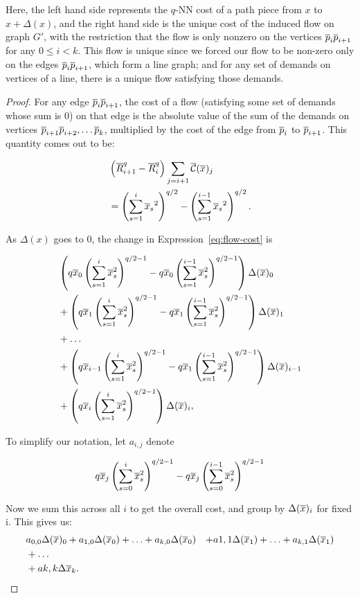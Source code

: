 Here, the left hand side represents the $q$-NN cost of a path piece from
$x$ to $x+\Delta(x)$, and the right hand side is the unique cost of the
induced flow on graph $G'$, with the restriction that the flow is only
nonzero on the vertices $\overline{p}_i\overline{p}_{i+1}$ for any $0 \leq i < k$. This flow
is unique since we forced our flow to be non-zero only on the edges
$\overline{p}_i\overline{p}_{i+1}$, which form a line graph; and for any set of demands on
vertices of a line, there is a unique flow satisfying those demands.

\begin{proof} For any edge $\overline{p}_i\overline{p}_{i+1}$, the cost of a flow (satisfying
some set of demands whose sum is $0$) on that edge is the absolute value of
the sum of the demands on vertices $\overline{p}_{i+1} \overline{p}_{i+2}, \ldots \overline{p}_k$,
multiplied by the cost of the edge from $\overline{p}_i$ to $\overline{p}_{i+1}$. This
quantity comes out to be:

\begin{align} &\left(\overline{R}_{i+1}^q-\overline{R}_{i}^q \right) \sum_{j=i+1} \overline{\mathcal{C}}(\overline{x})_j
\\
\label{eq:flow-cost}
&=\left(\sum_{s=1}^i {\overline{x}_s}^2\right)^{q/2} -\left(\sum_{s=1}^{i-1}
{\overline{x}_s}^2\right)^{q/2}.
\end{align}

As $\Delta(x)$ goes to $0$, the change in Expression~\ref{eq:flow-cost} is

\begin{align}
&
\left(q\overline{x}_0 \left(\sum_{s=1}^i \overline{x}_s^2 \right)^{q/2-1} -
q\overline{x}_0\left(\sum_{s=1}^{i-1} \overline{x}_s^2 \right)^{q/2-1} \right) \Delta(\overline{x})_0
\\
&+
\left(q\overline{x}_1 \left(\sum_{s=1}^i \overline{x}_s^2 \right)^{q/2-1} -
q\overline{x}_1\left(\sum_{s=1}^{i-1}\overline{x}_s^2 \right)^{q/2-1} \right) \Delta(\overline{x})_1
\\
&+ \ldots
\\
&+
\left(q\overline{x}_{i-1} \left(\sum_{s=1}^i \overline{x}_s^2 \right)^{q/2-1} -
q\overline{x}_1\left(\sum_{s=1}^{i-1}\overline{x}_s^2 \right)^{q/2-1}
\right)\Delta(\overline{x})_{i-1}
\\
&+
\left(q\overline{x}_i \left(\sum_{s=1}^i \overline{x}_s^2
\right)^{q/2-1}\right)\Delta(\overline{x})_i,
\end{align}

To simplify our notation, let $a_{i,j}$ denote

\[
q\overline{x}_j\left(\sum_{s=0}^i \overline{x}_s^2\right)^{q/2-1} - q\overline{x}_j\left(\sum_{s=0}^{i-1}
\overline{x}_s^2 \right)^{q/2-1}
\]

Now we sum this across all $i$ to get the overall cost, and group by
$\Delta(\overline{x})_i$ for fixed i. This gives us:
\begin{align}
&a_{0,0} \Delta(\overline{x})_0 + a_{1,0} \Delta(\overline{x}_0) + \ldots + a_{k, 0}
\Delta(\overline{x}_0)
&+a{1,1} \Delta(\overline{x}_1) + \ldots + a_{k, 1} \Delta(\overline{x}_1)
\\
&+ \ldots 
\\
&+ a{k,k} \Delta{\overline{x}_k}.
\end{align}


\end{proof}
